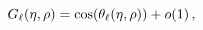 \[\mathop{G_{\ell}\/}\nolimits\!\left(\eta,\rho\right)=\mathop{\cos\/}\nolimits%
\!\left(\mathop{{\theta_{\ell}}\/}\nolimits\!\left(\eta,\rho\right)\right)+%
\mathop{o\/}\nolimits\!\left(1\right),\]